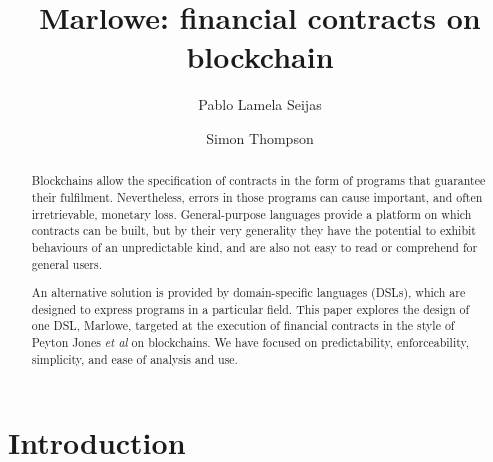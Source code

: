 \documentclass[
      acmsmall
    , screen
  ]{acmart}
\begin{document}
\title
  [Marlowe]
  {Marlowe: financial contracts on blockchain}

\author{Pablo Lamela Seijas}

\author{Simon Thompson}

\begin{abstract}

Blockchains allow the specification of contracts in the form of programs that guarantee their fulfilment. 
Nevertheless, errors in those programs can cause important, and often irretrievable, monetary loss. General-purpose languages provide a platform on which contracts can be built, but by their very generality they have the potential to exhibit behaviours of an unpredictable kind, and are also not easy to read or comprehend for general users. 

An alternative solution is provided by domain-specific languages (DSLs), which are designed to express programs in a particular field. This paper explores the design of one DSL, Marlowe, targeted at the execution of financial 
contracts in the style of Peyton Jones \emph{et al} on blockchains. We have focused on predictability, enforceability, simplicity, 
and ease of analysis and use.

\end{abstract}



%
%


\maketitle


\section{Introduction}
\end{document}
